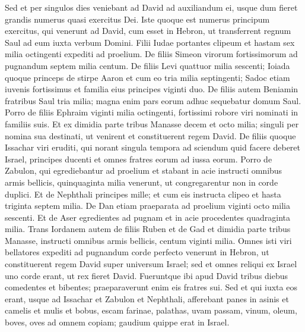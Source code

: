 \begin{biblechapter}
\verse Sed et per singulos dies veniebant ad David ad auxiliandum ei, usque dum fieret grandis numerus quasi exercitus Dei. 
\verse Iste quoque est numerus principum exercitus, qui venerunt ad David, cum esset in Hebron, ut transferrent regnum Saul ad eum iuxta verbum Domini. 
\verse Filii Iudae portantes clipeum et hastam sex milia octingenti expediti ad proelium. 
\verse De filiis Simeon virorum fortissimorum ad pugnandum septem milia centum. 
\verse De filiis Levi quattuor milia sescenti; 
\verse Ioiada quoque princeps de stirpe Aaron et cum eo tria milia septingenti; 
\verse Sadoc etiam iuvenis fortissimus et familia eius principes viginti duo. 
\verse De filiis autem Beniamin fratribus Saul tria milia; magna enim pars eorum adhuc sequebatur domum Saul. 
\verse Porro de filiis Ephraim viginti milia octingenti, fortissimi robore viri nominati in familiis suis. 
\verse Et ex dimidia parte tribus Manasse decem et octo milia; singuli per nomina sua destinati, ut venirent et constituerent regem David. 
\verse De filiis quoque Issachar viri eruditi, qui norant singula tempora ad sciendum quid facere deberet Israel, principes ducenti et omnes fratres eorum ad iussa eorum. 
\verse Porro de Zabulon, qui egrediebantur ad proelium et stabant in acie instructi omnibus armis bellicis, quinquaginta milia venerunt, ut congregarentur non in corde duplici. 
\verse Et de Nephthali principes mille; et cum eis instructa clipeo et hasta triginta septem milia. 
\verse De Dan etiam praeparata ad proelium viginti octo milia sescenti. 
\verse Et de Aser egredientes ad pugnam et in acie procedentes quadraginta milia. 
\verse Trans Iordanem autem de filiis Ruben et de Gad et dimidia parte tribus Manasse, instructi omnibus armis bellicis, centum viginti milia. 
\verse Omnes isti viri bellatores expediti ad pugnandum corde perfecto venerunt in Hebron, ut constituerent regem David super universum Israel; sed et omnes reliqui ex Israel uno corde erant, ut rex fieret David. 
\verse Fueruntque ibi apud David tribus diebus comedentes et bibentes; praeparaverunt enim eis fratres sui. 
\verse Sed et qui iuxta eos erant, usque ad Issachar et Zabulon et Nephthali, afferebant panes in asinis et camelis et mulis et bobus, escam farinae, palathas, uvam passam, vinum, oleum, boves, oves ad omnem copiam; gaudium quippe erat in Israel. 
\end{biblechapter}

